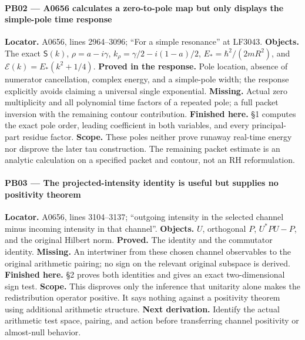 \paragraph{PB02 --- A0656 calculates a zero-to-pole map but only
displays the simple-pole time
response}\label{TranscriptLedgerStage:pb02-a0656-calculates-a-zero-to-pole-map-but-only-displays-the-simple-pole-time-response}

\textbf{Locator.} A0656, lines 2964--3096; ``For a simple resonance'' at
LF3043. \textbf{Objects.} The exact \(\mathsf S(k)\),
\(\rho=a-i\gamma\), \(k_\rho=\gamma/2-i(1-a)/2\),
\(E_*=\hbar^2/(2mR^2)\), and \(\mathcal E(k)=E_*(k^2+1/4)\).
\textbf{Proved in the response.} Pole location, absence of numerator
cancellation, complex energy, and a simple-pole width; the response
explicitly avoids claiming a universal single exponential.
\textbf{Missing.} Actual zero multiplicity and all polynomial time
factors of a repeated pole; a full packet inversion with the remaining
contour contribution. \textbf{Finished here.}
\protect{} §1 computes the exact pole order, leading
coefficient in both variables, and every principal-part residue factor.
\textbf{Scope.} These poles neither prove runaway real-time energy nor
disprove the later tau construction. The remaining packet estimate is an
analytic calculation on a specified packet and contour, not an RH
reformulation.

\paragraph{PB03 --- The projected-intensity identity is useful but
supplies no positivity
theorem}\label{TranscriptLedgerStage:pb03-the-projected-intensity-identity-is-useful-but-supplies-no-positivity-theorem}

\textbf{Locator.} A0656, lines 3104--3137; ``outgoing intensity in the
selected channel minus incoming intensity in that channel''.
\textbf{Objects.} \(U\), orthogonal \(P\), \(U^*PU-P\), and the original
Hilbert norm. \textbf{Proved.} The
\protect{} identity and the
commutator identity. \textbf{Missing.} An intertwiner from these chosen
channel observables to the original arithmetic pairing; no sign on the
relevant original subspace is derived. \textbf{Finished here.}
\protect{} §2 proves both identities and gives an
exact two-dimensional sign test. \textbf{Scope.} This disproves only the
inference that unitarity alone makes the redistribution operator
positive. It says nothing against a positivity theorem using additional
arithmetic structure. \textbf{Next derivation.} Identify the actual
arithmetic test space, pairing, and action before transferring channel
positivity or almost-null behavior.

